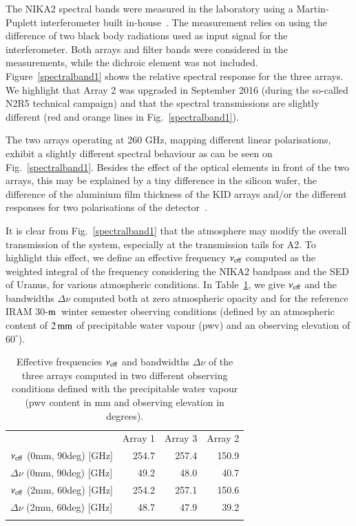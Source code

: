 \documentclass[traditionalabstract]{aa}
\newcommand{\trentemetre}{30-$\rm{m}$}
\newcommand{\lp}[1]{#1}
\begin{document}
The NIKA2 spectral bands were measured in the laboratory using a
Martin-Puplett interferometer built in-house~\citep{Durand2007_these}.
The measurement relies on using the difference of two black
body radiations used as input signal for the interferometer. 
{\lp Both arrays and filter bands were considered in the
measurements, while the dichroic element was not included.}
Figure~\ref{spectralband1} shows the relative spectral response for
the three arrays. We highlight that Array 2 was
upgraded in September 2016 (during the so-called N2R5 technical campaign) and that
the spectral transmissions are slightly different (red and orange lines in
Fig.~\ref{spectralband1}).

The two arrays operating at 260 GHz, mapping different linear polarisations,
exhibit a slightly different spectral behaviour as can be
seen on Fig.~\ref{spectralband1}. {\lp Besides the effect of the
optical elements in front of the two arrays, this may be explained by
a tiny difference in the silicon wafer, the difference of the
aluminium film thickness of the KID arrays and/or the different
responses for two polarisations of the
detector~\citep{Adam2018, Shu2018_bandpass}.}

It is clear from Fig.~\ref{spectralband1} that the atmosphere may
modify the overall transmission of the system, especially at the
transmission tails for A2. {\lp To highlight this effect, we define an effective
frequency $\nu_{\rm{eff}}$ computed as the weighted integral of the
frequency considering the NIKA2 bandpass and the SED of Uranus, for
various atmospheric conditions.}
In Table~\ref{tab:frequencies}, we give $\nu_{\rm{eff}}$ and the
bandwidths $\Delta \nu$ computed both at zero atmospheric opacity and for the
reference IRAM \trentemetre\ winter semester observing conditions
(defined by an atmospheric content of $2\,\rm{mm}$ of precipitable
water vapour (pwv) and an observing elevation of $60^{\circ}$).

\begin{table}[!htbp]
  \caption[]{Effective frequencies $\nu_{\rm{eff}}$ and bandwidths
    $\Delta \nu$
    of the three arrays computed in two different observing conditions
    defined with the precipitable water vapour (pwv content in mm and
    observing elevation in degrees).}
  \label{tab:frequencies}
  \centering    
  \begin{tabular}{lrrr}
    \hline\hline
    \noalign{\smallskip}
    & Array 1 & Array 3 & Array 2 \\
    \noalign{\smallskip}
    \hline
    \noalign{\smallskip}
    $\nu_{\rm{eff}}$ \small{(0mm, 90deg)} [GHz] & 254.7 & 257.4 &  150.9 \\
    $\Delta \nu$ \small{(0mm, 90deg)} [GHz] &  49.2 & 48.0  &   40.7 \\
    $\nu_{\rm{eff}}$ \small{(2mm, 60deg)} [GHz] & 254.2 & 257.1 &  150.6 \\
    $\Delta \nu$ \small{(2mm, 60deg)} [GHz] &  48.7 &  47.9 &    39.2 \\
    \noalign{\smallskip}
    \hline
  \end{tabular}
\end{table}
\end{document}
